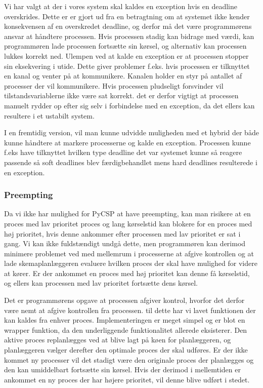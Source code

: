 Vi har valgt at der i vores system skal kaldes en exception hvis en deadline overskrides. Dette er er gjort ud fra en betragtning om at systemet ikke kender konsekvensen af en overskredet deadline, og derfor må det være programmørens ansvar at håndtere processen.  Hvis processen stadig kan bidrage med værdi, kan programmøren lade processen fortsætte sin kørsel, og alternativ kan processen lukkes korrekt ned. Ulempen ved at kalde en exception er at processen stopper sin eksekvering i utide. Dette giver problemer f.eks. hvis processen er tilknyttet en kanal og venter på at kommunikere.  Kanalen holder en styr på antallet af processer der vil kommunikere. Hvis processen pludseligt forsvinder vil tilstandsvariablerne ikke være sat korrekt. det er derfor vigtigt at processen manuelt rydder op efter sig selv i forbindelse med en exception, da det ellers kan resultere i et ustabilt system.

I en fremtidig version, vil man kunne udvidde muligheden med et hybrid der både kunne håndtere at markere processerne og kalde en exception. Processen kunne f.eks have  tilknyttet hvilken type deadline det var systemet kunne så reagere passende så soft deadlines blev færdigbehandlet mens hard deadlines resulterede i en exception.




\subsubsection{Preempting}

Da vi ikke har mulighed for PyCSP at have preempting, kan  man risikere at en proces med lav prioritet proces og lang kørselstid kan blokere for en proces med høj prioritet, hvis denne ankommer efter processen med lav prioritet er sat i gang. Vi kan ikke fuldstændigt undgå dette, men programmøren kan derimod minimere problemet ved med mellemrum i processerne at afgive kontrollen og at lade  skemaplanlæggeren evaluere hvilken proces der skal have mulighed for videre at kører. Er der ankommet en proces med høj prioritet kan denne få kørselstid, og ellers kan processen med lav prioritet fortsætte dens kørsel. 

Det er programmørens opgave at processen afgiver kontrol, hvorfor det  derfor være nemt at afgive kontrollen fra processen. til dette har vi lavet funktionen  der kan kaldes fra enhver proces. 
Implementeringen er meget simpel og er blot en wrapper funktion, da den underliggende funktionalitet allerede eksisterer. Den aktive proces replanlægges ved at blive lagt på køen for planlæggeren, og planlæggeren vælger derefter den optimale proces der skal udføres. Er der ikke kommet ny processer vil det stadigt være den originale proces der planlægges og den kan umiddelbart fortsætte sin kørsel. Hvis der derimod i mellemtiden er ankommet en ny proces der har højere prioritet, vil denne blive udført i stedet.

